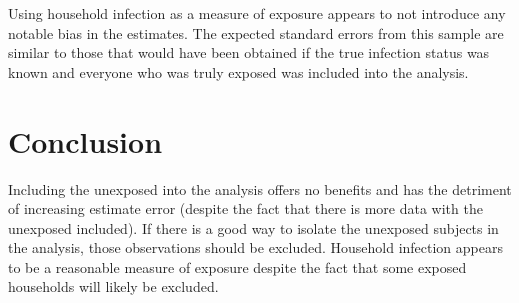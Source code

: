 \documentclass[]{article}
\begin{document}
Using household infection as a measure of exposure appears to not introduce any notable bias in the estimates. The expected standard errors from this sample are similar to those that would have been obtained if the true infection status was known and everyone who was truly exposed was included into the analysis.

\hypertarget{conclusion}{%
\section{Conclusion}\label{conclusion}}

Including the unexposed into the analysis offers no benefits and has the detriment of increasing estimate error (despite the fact that there is more data with the unexposed included). If there is a good way to isolate the unexposed subjects in the analysis, those observations should be excluded. Household infection appears to be a reasonable measure of exposure despite the fact that some exposed households will likely be excluded.
\end{document}
